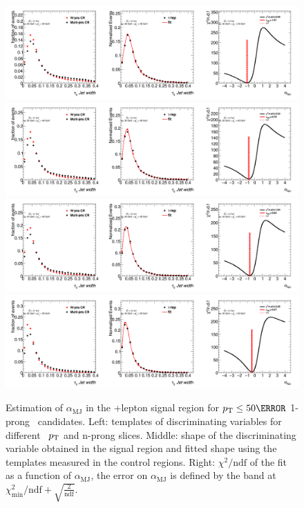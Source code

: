 		\begin{figure}
		\begin{center}
		 \includegraphics[width=1\textwidth]{chapters/chapter6_HPlus/images/FFs/FFs_FIT_SR_TAULEP_1_30_35.png}
		\includegraphics[width=1\textwidth]{chapters/chapter6_HPlus/images/FFs/FFs_FIT_SR_TAULEP_1_35_40.png}
		\includegraphics[width=1\textwidth]{chapters/chapter6_HPlus/images/FFs/FFs_FIT_SR_TAULEP_1_40_45.png}
		\includegraphics[width=1\textwidth]{chapters/chapter6_HPlus/images/FFs/FFs_FIT_SR_TAULEP_1_45_50.png}
		\end{center}
		\caption{
		Estimation of $\alpha_\mathrm{MJ}$ in the \tauhad+lepton signal region for $\pt \leq 50 \GeV$
		1-prong \tauhad\ candidates. Left: templates of discriminating variables for different \tauhad\ $p_{\text{T}}$
		and n-prong slices. Middle: shape of the discriminating variable obtained in the signal region and fitted
		shape using the templates measured in the control regions. Right: $\chi^2/\mathrm{ndf}$ of the fit as a
		function of $\alpha_\mathrm{MJ}$, the error on $\alpha_\mathrm{MJ}$ is defined by the band at
		$\chi^2_\mathrm{min}/\mathrm{ndf}+\sqrt{\frac{2}{\mathrm{ndf}}}$.
		}
		\label{fig:mm:Fits:region7_1}
		\end{figure}


